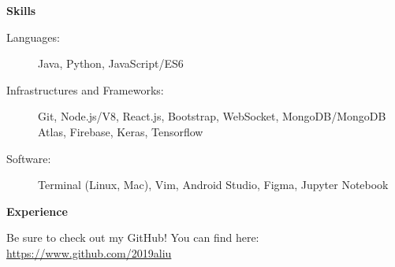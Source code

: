 \documentclass[letterpaper,10pt]{article}
\newcommand{\resheading}[1]{{\large \colorbox{mygrey}{\begin{minipage}{\textwidth}{\textbf{#1 \vphantom{p\^{E}}}}\end{minipage}}}}
\begin{document}
\resheading{Skills}

\begin{description}
\item[Languages:] Java, Python, JavaScript/ES6
\item[Infrastructures and Frameworks:] Git, Node.js/V8, React.js, Bootstrap, WebSocket, MongoDB/MongoDB Atlas, Firebase, Keras, Tensorflow
\item[Software:] Terminal (Linux, Mac), Vim, Android Studio, Figma, Jupyter Notebook
\end{description}

\resheading{Experience}

\vspace{1em}
Be sure to check out my GitHub! You can find here:  \url{https://www.github.com/2019aliu}
\end{document}
